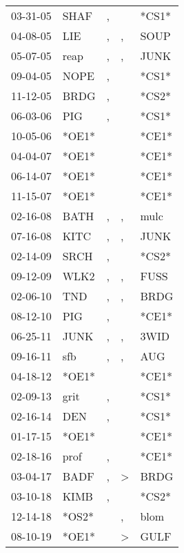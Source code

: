 \begin{supertabular}{lllll}
 03-31-05 &   SHAF &  , &               &  *CS1* \\
 04-08-05 &    LIE &  , &             , &   SOUP \\
 05-07-05 &   reap &  , &             , &   JUNK \\
 09-04-05 &   NOPE &  , &               &  *CS1* \\
 11-12-05 &   BRDG &  , &               &  *CS2* \\
 06-03-06 &    PIG &  , &               &  *CS1* \\
 10-05-06 &  *OE1* &    &               &  *CE1* \\
 04-04-07 &  *OE1* &    &               &  *CE1* \\
 06-14-07 &  *OE1* &    &               &  *CE1* \\
 11-15-07 &  *OE1* &    &               &  *CE1* \\
 02-16-08 &   BATH &  , &             , &   mulc \\
 07-16-08 &   KITC &  , &             , &   JUNK \\
 02-14-09 &   SRCH &  , &               &  *CS2* \\
 09-12-09 &   WLK2 &  , &             , &   FUSS \\
 02-06-10 &    TND &  , &             , &   BRDG \\
 08-12-10 &    PIG &  , &               &  *CE1* \\
 06-25-11 &   JUNK &  , &             , &   3WID \\
 09-16-11 &    sfb &  , &             , &    AUG \\
 04-18-12 &  *OE1* &    &               &  *CE1* \\
 02-09-13 &   grit &  , &               &  *CS1* \\
 02-16-14 &    DEN &  , &               &  *CS1* \\
 01-17-15 &  *OE1* &    &               &  *CE1* \\
 02-18-16 &   prof &  , &               &  *CE1* \\
 03-04-17 &   BADF &  , &  \textgreater &   BRDG \\
 03-10-18 &   KIMB &  , &               &  *CS2* \\
 12-14-18 &  *OS2* &    &             , &   blom \\
 08-10-19 &  *OE1* &    &  \textgreater &   GULF \\
\end{supertabular}
